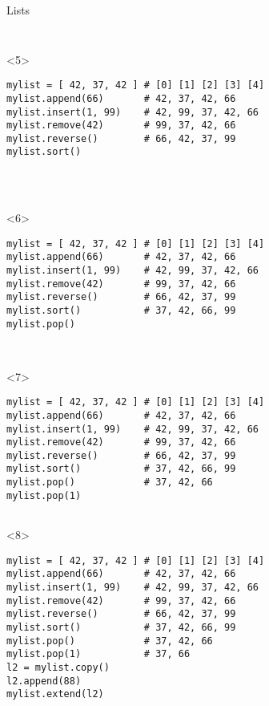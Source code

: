 \begin{frame}[fragile]{Lists}
\begin{center}
\begin{columns}[onlytextwidth]
\begin{column}{\textwidth}
\begin{onlyenv}
\begin{lstlisting}[style=python,morekeywords={for, in, range, list}]
       \end{lstlisting}
      \end{onlyenv}

      \begin{onlyenv}<5>
        \begin{lstlisting}[style=python,morekeywords={for, in, range, list}]
mylist = [ 42, 37, 42 ] # [0] [1] [2] [3] [4]
mylist.append(66)       # 42, 37, 42, 66
mylist.insert(1, 99)    # 42, 99, 37, 42, 66
mylist.remove(42)       # 99, 37, 42, 66
mylist.reverse()        # 66, 42, 37, 99
mylist.sort()




       \end{lstlisting}
      \end{onlyenv}

      \begin{onlyenv}<6>
        \begin{lstlisting}[style=python,morekeywords={for, in, range, list}]
mylist = [ 42, 37, 42 ] # [0] [1] [2] [3] [4]
mylist.append(66)       # 42, 37, 42, 66
mylist.insert(1, 99)    # 42, 99, 37, 42, 66
mylist.remove(42)       # 99, 37, 42, 66
mylist.reverse()        # 66, 42, 37, 99
mylist.sort()           # 37, 42, 66, 99
mylist.pop()



       \end{lstlisting}
      \end{onlyenv}

      \begin{onlyenv}<7>
        \begin{lstlisting}[style=python,morekeywords={for, in, range, list}]
mylist = [ 42, 37, 42 ] # [0] [1] [2] [3] [4]
mylist.append(66)       # 42, 37, 42, 66
mylist.insert(1, 99)    # 42, 99, 37, 42, 66
mylist.remove(42)       # 99, 37, 42, 66
mylist.reverse()        # 66, 42, 37, 99
mylist.sort()           # 37, 42, 66, 99
mylist.pop()            # 37, 42, 66
mylist.pop(1)


       \end{lstlisting}
      \end{onlyenv}

      \begin{onlyenv}<8>
        \begin{lstlisting}[style=python,morekeywords={for, in, range, list}]
mylist = [ 42, 37, 42 ] # [0] [1] [2] [3] [4]
mylist.append(66)       # 42, 37, 42, 66
mylist.insert(1, 99)    # 42, 99, 37, 42, 66
mylist.remove(42)       # 99, 37, 42, 66
mylist.reverse()        # 66, 42, 37, 99
mylist.sort()           # 37, 42, 66, 99
mylist.pop()            # 37, 42, 66
mylist.pop(1)           # 37, 66
l2 = mylist.copy()
l2.append(88)
mylist.extend(l2) \end{lstlisting}
      \end{onlyenv}


\end{column}
\end{columns}
\end{center}
\end{frame}
